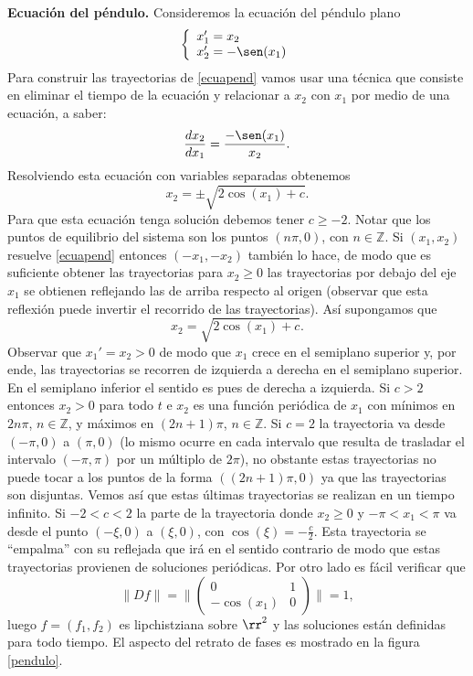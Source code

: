 \begin{ejemplo}\textbf{Ecuación del péndulo.} Consideremos la ecuación del péndulo plano
\begin{equation}\label{ecuapend}
\left\{%
\begin{array}{l}
    x_1'=x_2 \\
    x_2'=-\sen(x_1) \\
\end{array}%
\right.
\end{equation}
Para construir las trayectorias de \eqref{ecuapend} vamos usar una
técnica que consiste en eliminar el tiempo de la ecuación y
relacionar a $x_2$ con $x_1$ por medio de una ecuación, a saber:
\[
    \frac{dx_2}{dx_1}=\frac{-\sen(x_1)}{x_2 }.
\]
Resolviendo esta ecuación con variables separadas obtenemos
\[
    x_2=\pm\sqrt{2\cos(x_1)+c}.
\]
Para que esta ecuación tenga solución debemos tener $c\geq -2$.
Notar que los puntos de equilibrio del sistema son los puntos
$(n\pi,0)$, con $n\in\mathbb{Z}$. Si $(x_1,x_2)$ resuelve
\eqref{ecuapend} entonces $(-x_1,-x_2)$ también lo hace, de modo
que es suficiente obtener las trayectorias para $x_2\geq 0$ las
trayectorias por debajo del eje $x_1$ se obtienen reflejando las
de arriba respecto al origen (observar que esta reflexión puede
invertir el recorrido de las trayectorias). Así supongamos que
\[
    x_2=\sqrt{2\cos(x_1)+c}.
\]
Observar que $x_1'=x_2>0$ de modo que $x_1$ crece en el semiplano
superior y, por ende, las trayectorias se recorren de izquierda a
derecha en el semiplano superior. En el semiplano inferior el
sentido es pues de derecha a izquierda. Si $c>2$ entonces $x_2>0$
para todo $t$ e $x_2$ es una función periódica de $x_1$ con
mínimos en $2n\pi$, $n\in\mathbb{Z}$, y máximos en $(2n+1)\pi$,
$n\in\mathbb{Z}$. Si $c=2$ la trayectoria va desde $(-\pi,0)$ a
$(\pi,0)$ (lo mismo ocurre en cada intervalo que resulta de
trasladar el intervalo $(-\pi,\pi)$ por un múltiplo de $2\pi$), no
obstante estas trayectorias no puede tocar a los puntos de la
forma $((2n+1)\pi,0)$ ya que las trayectorias son disjuntas. Vemos
así que estas últimas trayectorias se realizan en un tiempo
infinito. Si $-2<c<2$ la parte de la trayectoria donde $x_2\geq 0$
y $-\pi <x_1<\pi$ va desde el punto $(-\xi,0)$ a $(\xi,0)$, con
$\cos(\xi)=-\frac{c}{2}$. Esta trayectoria se ``empalma'' con su
reflejada que irá en el sentido contrario de modo que estas
trayectorias provienen de soluciones periódicas. Por otro lado es
fácil verificar que
\[
    \|Df\|=\bigg\|\begin{pmatrix}
    0&1\\-\cos(x_1)&0\end{pmatrix}\bigg\|= 1,
\]
luego $f=(f_1,f_2)$ es lipchistziana sobre $\rr^2$ y las
soluciones están definidas para todo tiempo. El aspecto del
retrato de fases es mostrado en la figura \ref{pendulo}.
\begin{figure}[h]
\begin{center}
\def\Func{y[1]|-sin(y[0])}


\end{center}
\end{figure}
\end{ejemplo}
